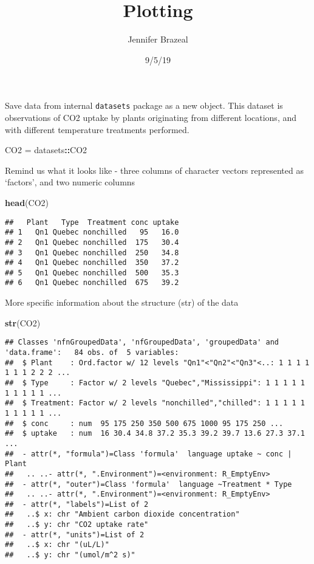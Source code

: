 \documentclass[]{article}
\title{Plotting}
\author{Jennifer Brazeal}
\date{9/5/19}
\newenvironment{Shaded}{\begin{snugshade}}{\end{snugshade}}
\newcommand{\KeywordTok}[1]{\textcolor[rgb]{0.13,0.29,0.53}{\textbf{#1}}}
\newcommand{\NormalTok}[1]{#1}
\newcommand{\OperatorTok}[1]{\textcolor[rgb]{0.81,0.36,0.00}{\textbf{#1}}}
\newcommand{\StringTok}[1]{\textcolor[rgb]{0.31,0.60,0.02}{#1}}
\begin{document}
\maketitle

Save data from internal \texttt{datasets} package as a new object. This
dataset is observations of CO2 uptake by plants originating from
different locations, and with different temperature treatments
performed.

\begin{Shaded}
\begin{Highlighting}[]
\NormalTok{CO2 =}\StringTok{ }\NormalTok{datasets}\OperatorTok{::}\NormalTok{CO2}
\end{Highlighting}
\end{Shaded}

Remind us what it looks like - three columns of character vectors
represented as `factors', and two numeric columns

\begin{Shaded}
\begin{Highlighting}[]
\KeywordTok{head}\NormalTok{(CO2)}
\end{Highlighting}
\end{Shaded}

\begin{verbatim}
##   Plant   Type  Treatment conc uptake
## 1   Qn1 Quebec nonchilled   95   16.0
## 2   Qn1 Quebec nonchilled  175   30.4
## 3   Qn1 Quebec nonchilled  250   34.8
## 4   Qn1 Quebec nonchilled  350   37.2
## 5   Qn1 Quebec nonchilled  500   35.3
## 6   Qn1 Quebec nonchilled  675   39.2
\end{verbatim}

More specific information about the structure (str) of the data

\begin{Shaded}
\begin{Highlighting}[]
\KeywordTok{str}\NormalTok{(CO2)}
\end{Highlighting}
\end{Shaded}

\begin{verbatim}
## Classes 'nfnGroupedData', 'nfGroupedData', 'groupedData' and 'data.frame':   84 obs. of  5 variables:
##  $ Plant    : Ord.factor w/ 12 levels "Qn1"<"Qn2"<"Qn3"<..: 1 1 1 1 1 1 1 2 2 2 ...
##  $ Type     : Factor w/ 2 levels "Quebec","Mississippi": 1 1 1 1 1 1 1 1 1 1 ...
##  $ Treatment: Factor w/ 2 levels "nonchilled","chilled": 1 1 1 1 1 1 1 1 1 1 ...
##  $ conc     : num  95 175 250 350 500 675 1000 95 175 250 ...
##  $ uptake   : num  16 30.4 34.8 37.2 35.3 39.2 39.7 13.6 27.3 37.1 ...
##  - attr(*, "formula")=Class 'formula'  language uptake ~ conc | Plant
##   .. ..- attr(*, ".Environment")=<environment: R_EmptyEnv> 
##  - attr(*, "outer")=Class 'formula'  language ~Treatment * Type
##   .. ..- attr(*, ".Environment")=<environment: R_EmptyEnv> 
##  - attr(*, "labels")=List of 2
##   ..$ x: chr "Ambient carbon dioxide concentration"
##   ..$ y: chr "CO2 uptake rate"
##  - attr(*, "units")=List of 2
##   ..$ x: chr "(uL/L)"
##   ..$ y: chr "(umol/m^2 s)"
\end{verbatim}
\end{document}

